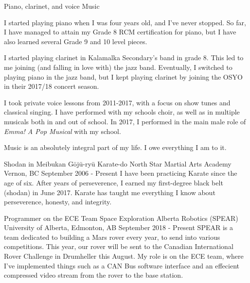 

\begin{cventries}

  \cventry
    {Piano, clarinet, and voice} %
    {Music} %
    {} %
    {} %
    {
      \begin{cvitems} %
        \item {I started playing piano when I was four years old, and I've never stopped. So far, I have managed to attain my Grade 8 RCM certification for piano, but I have also learned several Grade 9 and 10 level pieces.}
        \item {I started playing clarinet in Kalamalka Secondary's band in grade 8. This led to me joining (and falling in love with) the jazz band. Eventually, I switched to playing piano in the jazz band, but I kept playing clarinet by joining the OSYO in their 2017/18 concert season.}
        \item {I took private voice lessons from 2011-2017, with a focus on show tunes and classical singing. I have performed with my schools choir, as well as in multiple musicals both in and out of school. In 2017, I performed in the main male role of \textit{Emma! A Pop Musical} with my school.}
        \item {Music is an absolutely integral part of my life. I owe everything I am to it.}
      \end{cvitems}
    }

  \cventry
    {Shodan in Meibukan Gōjū-ryū Karate-do}
    {North Star Martial Arts Academy}
    {Vernon, BC}
    {September 2006 - Present}
    {I have been practicing Karate since the age of six. After years of perseverence, I earned my first-degree black belt (shodan) in June 2017. Karate has taught me everything I know about perseverence, honesty, and integrity.}

  \cventry
    {Programmer on the ECE Team}
    {Space Exploration Alberta Robotics (SPEAR)}
    {University of Alberta, Edmonton, AB}
    {September 2018 - Present}
    {SPEAR is a team dedicated to building a Mars rover every year, to send into various competitions. This year, our rover will be sent to the Canadian International Rover Challenge in Drumheller this August. My role is on the ECE team, where I've implemented things such as a CAN Bus software interface and an effecient compressed video stream from the rover to the base station.}

\end{cventries}

